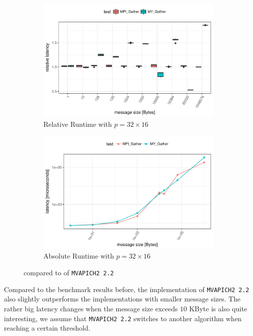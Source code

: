 \begin{figure}[H]
    \begin{subfigure}[b]{0.49\textwidth}
        \includegraphics[width=\textwidth]{../benchmarks/mpich/binom/gather_32/rel_runtime.pdf}
        \caption{Relative Runtime with $p=32 \times 16$}
        \label{fig:Gather:MPICH:Rel:32}
    \end{subfigure}
    \begin{subfigure}[b]{0.49\textwidth}
        \includegraphics[width=\textwidth]{../benchmarks/mpich/binom/gather_32/runtime.pdf}
        \caption{Absolute Runtime with $p=32 \times 16$}
        \label{fig:Gather:MPICH:Abs:32}
    \end{subfigure}
    
    \caption{\mygather compared to \mpigather of \texttt{MVAPICH2 2.2}}
\end{figure}

\noindent Compared to the benchmark results before, the \mpigather implementation of \texttt{MVAPICH2 2.2} also slightly outperforms the \mygather implementations with smaller message sizes. The rather big latency changes when the message size exceeds $10$ KByte is also quite interesting, we assume that \texttt{MVAPICH2 2.2} switches to another algorithm when reaching a certain threshold.

